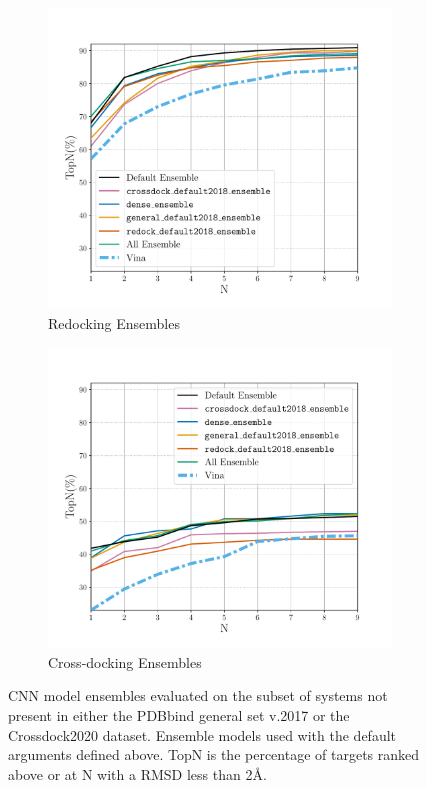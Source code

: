 \documentclass[journal=jcisd8,manuscript=article]{achemso}
\begin{document}
\begin{figure}    
        \begin{subfigure}[b]{0.48\textwidth}    
		\centering
		\includegraphics[width=\textwidth]{figures/redocking/ensemble_models_no2017_nocd2020_line.pdf}
		\caption{Redocking Ensembles}
		\label{fig:No2017NoCD20EnsRD}
        \end{subfigure}    
        \begin{subfigure}[b]{0.48\textwidth}    
		\centering
		\includegraphics[width=\textwidth]{figures/crossdocking/ensemble_models_no2017_nocd2020_line.pdf}
		\caption{Cross-docking Ensembles}
                \label{fig:No2017NoCD20EnsCD}
        \end{subfigure}
	\caption{CNN model ensembles evaluated on the subset of systems not present in either the PDBbind general set v.2017 or the Crossdock2020 dataset. Ensemble models used with the default arguments defined above. TopN is the percentage of targets ranked above or at N with a RMSD less than 2{\AA}.}
	\label{fig:No2017NoCD20}
\end{figure}  
\end{document}
